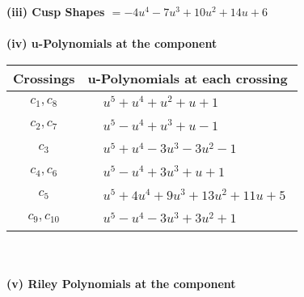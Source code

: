 \documentclass[1p]{elsarticle_modified}
\theoremstyle{definition}
\begin{document}
\flushleft \textbf{(iii) Cusp Shapes $= -4 u^4-7 u^3+10 u^2+14 u+6$}\\~\\
\newpage\renewcommand{\arraystretch}{1}
\flushleft \textbf{(iv) u-Polynomials at the component}\newline \\
\begin{tabular}{m{50pt}|m{274pt}}
Crossings & \hspace{64pt}u-Polynomials at each crossing \\
\hline $$\begin{aligned}c_{1},c_{8}\end{aligned}$$&$\begin{aligned}
&u^5+u^4+u^2+u+1
\end{aligned}$\\
\hline $$\begin{aligned}c_{2},c_{7}\end{aligned}$$&$\begin{aligned}
&u^5- u^4+u^3+u-1
\end{aligned}$\\
\hline $$\begin{aligned}c_{3}\end{aligned}$$&$\begin{aligned}
&u^5+u^4-3 u^3-3 u^2-1
\end{aligned}$\\
\hline $$\begin{aligned}c_{4},c_{6}\end{aligned}$$&$\begin{aligned}
&u^5- u^4+3 u^3+u+1
\end{aligned}$\\
\hline $$\begin{aligned}c_{5}\end{aligned}$$&$\begin{aligned}
&u^5+4 u^4+9 u^3+13 u^2+11 u+5
\end{aligned}$\\
\hline $$\begin{aligned}c_{9},c_{10}\end{aligned}$$&$\begin{aligned}
&u^5- u^4-3 u^3+3 u^2+1
\end{aligned}$\\
\hline
\end{tabular}\\~\\
\newpage\renewcommand{\arraystretch}{1}
\flushleft \textbf{(v) Riley Polynomials at the component}\newline \\
\end{document}
